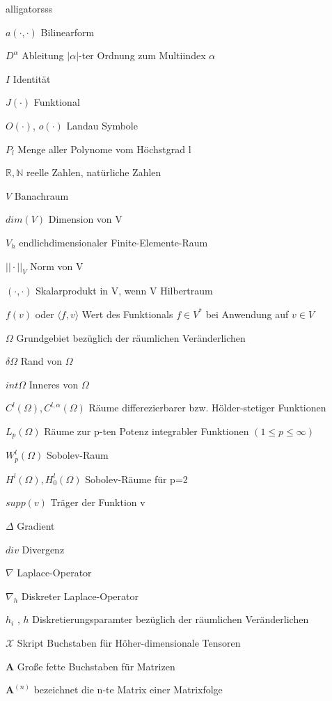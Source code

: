 \documentclass[12pt,a4paper]{scrartcl}
\numberwithin{equation}{section}
\begin{document}
\begin{labeling}{alligatorsss \quad \quad }
\item [$a(\cdot,\cdot)$] Bilinearform
\item [$D^{\alpha}$] Ableitung $|\alpha|$-ter Ordnung zum Multiindex $\alpha$
\item [$I$] Identität
\item [$J(\cdot)$] Funktional
\item [$O(\cdot)$, $o(\cdot)$] Landau Symbole
\item [$P_l$] Menge aller Polynome vom Höchstgrad l
\item [$\mathbb{R},\mathbb{N}$] reelle Zahlen, natürliche Zahlen
\item [$V$] Banachraum
\item [$dim(V)$] Dimension von V
\item [$V_h$] endlichdimensionaler Finite-Elemente-Raum
\item [$||\cdot||_V$] Norm von V
\item [$(\cdot,\cdot)$] Skalarprodukt in V, wenn V Hilbertraum
\item [$f(v)$ oder $\langle f , v \rangle$] Wert des Funktionals $f \in V^{*}$ bei Anwendung auf $v \in V$
\item [$\Omega$] Grundgebiet bezüglich der räumlichen Veränderlichen
\item [$\delta \Omega$] Rand von $\Omega$
\item [$int \Omega$] Inneres von $\Omega$
\item [$C^{l}(\Omega), C^{l,\alpha}(\Omega)$] Räume differezierbarer bzw. Hölder-stetiger Funktionen
\item [$L_p(\Omega)$] Räume zur p-ten Potenz integrabler Funktionen $(1 \leq p \leq \infty)$
\item [$W_p^l(\Omega)$] Sobolev-Raum
\item [$H^l(\Omega),H_0^l(\Omega)$] Sobolev-Räume für p=2
\item [$supp(v)$] Träger der Funktion v
\item [$\Delta$] Gradient
\item [$div$] Divergenz
\item [$\nabla$] Laplace-Operator
\item [$\nabla_h$] Diskreter Laplace-Operator
\item [$h_i$ , $h$] Diskretierungsparamter bezüglich der räumlichen Veränderlichen
\item [$\pmb{\mathscr{X}}$] Skript Buchstaben für Höher-dimensionale Tensoren
\item [$\textbf{A}$] Große fette Buchstaben für Matrizen
\item [$\textbf{A}^{(n)}$] bezeichnet die n-te Matrix einer Matrixfolge
\end{labeling}
\end{document}
